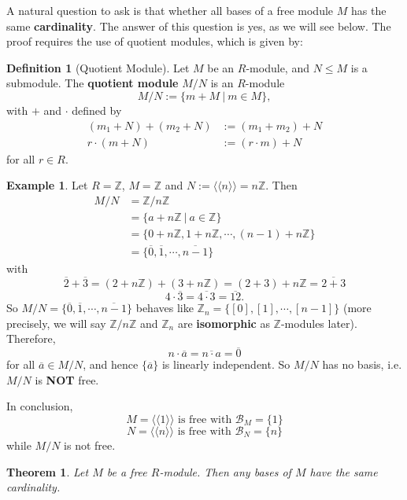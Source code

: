 \documentclass[11pt,openany]{book}
\theoremstyle{plain}
\newtheorem{theorem}{Theorem}[chapter]
\theoremstyle{definition}
\newtheorem{definition}[definition]{Definition}
\newtheorem{example}[example]{Example}
\theoremstyle{remark}
\begin{document}
A natural question to ask is that whether all bases of a free module $M$ has the same {\bf cardinality}. The answer of this question is yes, as we will see below. The proof requires the use of quotient modules, which is given by:
\begin{definition}[Quotient Module]
    Let $M$ be an $R$-module, and $N\leq M$ is a submodule. The {\bf quotient module} $M/N$ is an $R$-module
    $$M/N:=\{m+M \ |\ m\in M\},$$
    with $+$ and $\cdot$ defined by
    \begin{align*}
        (m_1+N)+(m_2+N)&:=(m_1+m_2)+N\\
        r\cdot (m+N)&:=(r\cdot m)+N
    \end{align*}
    for all $r\in R$.
\end{definition}

\begin{example}
    Let $R=\mathbb{Z}$, $M=\mathbb{Z}$ and $N:=\langle\langle n\rangle\rangle=n\mathbb{Z}$. Then
    \begin{align*}
        M/N&=\mathbb{Z}/n\mathbb{Z}\\
        &=\{a+n\mathbb{Z}\ |\ a\in \mathbb{Z}\}\\
        &=\{0+n\mathbb{Z},1+n\mathbb{Z},\cdots,(n-1)+n\mathbb{Z}\}\\
        &=\{\overline{0},\overline{1},\cdots,\overline{n-1}\}
    \end{align*}
    with
    $$\overline{2}+\overline{3}=(2+n\mathbb{Z})+(3+n\mathbb{Z})=(2+3)+n\mathbb{Z}=\overline{2+3}$$
    $$4\cdot \overline{3}=\overline{4\cdot3}=\overline{12}.$$
    So $M/N=\{\overline{0},\overline{1},\cdots,\overline{n-1}\}$ behaves like $\mathbb{Z}_{n}=\{[0],[1],\cdots,[n-1]\}$ (more precisely, we will say $\mathbb{Z}/n\mathbb{Z}$ and $\mathbb{Z}_n$ are {\bf isomorphic} as $\mathbb{Z}$-modules later). Therefore,
    $$n\cdot\overline{a}=\overline{n\cdot a}=\overline{0}$$
    for all $\overline{a}\in M/N$, and hence $\{\overline{a}\}$ is linearly independent. So $M/N$ has no basis, i.e. $M/N$ is {\bf NOT} free.

    In conclusion,
    $$M=\langle\langle1\rangle\rangle\text{ is free with }\mathcal{B}_{M}=\{1\}$$
    $$N=\langle\langle n\rangle\rangle\text{ is free with }\mathcal{B}_{N}=\{n\}$$
    while $M/N$ is not free.
\end{example}

\begin{theorem} \label{thm-freebasis}
    Let $M$ be a free $R$-module. Then any bases of $M$ have the same cardinality.
\end{theorem}
\end{document}

